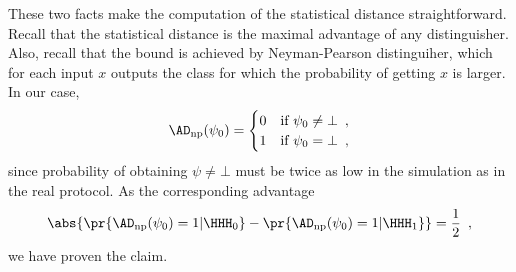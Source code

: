 \documentclass{crypto-exercise}
\begin{document}
\begin{solution}
These two facts make the computation of the statistical distance straightforward. Recall that the statistical distance is the maximal advantage of any distinguisher. Also, recall that the bound is achieved by Neyman-Pearson distinguiher, which for each input $x$ outputs the class for which the probability  of getting $x$ is larger. In our case,
\begin{align*}
\AD_{\text{np}}(\psi_0)=
\begin{cases}
0 & \text{if } \psi_0\neq \bot\enspace,\\
1 & \text{if } \psi_0 = \bot\enspace,
\end{cases}
\end{align*} 
since probability of obtaining $\psi\neq\bot$ must be twice as low in the simulation as in the real protocol. As the corresponding advantage 
\begin{align*}
\abs{\pr{\AD_{\text{np}}(\psi_0)=1|\HHH_0}- \pr{\AD_{\text{np}}(\psi_0)=1|\HHH_1}}=\frac{1}{2}\enspace,
\end{align*}
we have proven the claim.


\end{solution}
\end{document}
